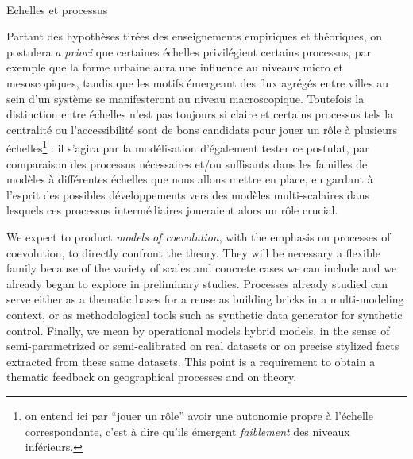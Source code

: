 
\paragraph{}{Echelles et processus}

Partant des hypothèses tirées des enseignements empiriques et théoriques, on postulera \emph{a priori} que certaines échelles privilégient certains processus, par exemple que la forme urbaine aura une influence au niveaux micro et mesoscopiques, tandis que les motifs émergeant des flux agrégés entre villes au sein d'un système se manifesteront au niveau macroscopique. Toutefois la distinction entre échelles n'est pas toujours si claire et certains processus tels la centralité ou l'accessibilité sont de bons candidats pour jouer un rôle à plusieurs échelles\footnote{on entend ici par ``jouer un rôle'' avoir une autonomie propre à l'échelle correspondante, c'est à dire qu'ils émergent \emph{faiblement}  des niveaux inférieurs.}
 : il s'agira par la modélisation d'également tester ce postulat, par comparaison des processus nécessaires et/ou suffisants dans les familles de modèles à différentes échelles que nous allons mettre en place, en gardant à l'esprit des possibles développements vers des modèles multi-scalaires dans lesquels ces processus intermédiaires joueraient alors un rôle crucial.



We expect to product \emph{models of coevolution}, 
 with the emphasis on processes of coevolution, to directly confront the theory. They will be necessary a flexible family because of the variety of scales and concrete cases we can include and we already began to explore in preliminary studies. Processes already studied can serve either as a thematic bases for a reuse as building bricks in a multi-modeling context, or as methodological tools such as synthetic data generator for synthetic control. Finally, we mean by operational models hybrid models, in the sense of semi-parametrized or semi-calibrated on real datasets or on precise stylized facts extracted from these same datasets. This point is a requirement to obtain a thematic feedback on geographical processes and on theory.














